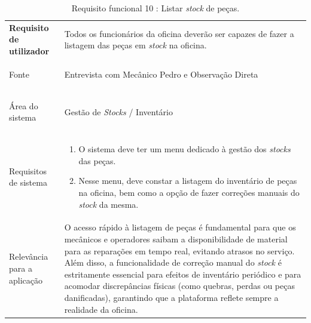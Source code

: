 \documentclass[a4paper,12pt]{scrreprt}
\begin{document}
\begin{table}[H]
    \centering
    \renewcommand{\arraystretch}{1.5} 
    
    \begin{tabular}{|>{\columncolor{gray!15}\bfseries}p{4cm}|p{10.5cm}|}
        \hline
        Requisito de utilizador & Todos os funcionários da oficina deverão ser capazes de fazer a listagem das peças em \textit{stock} na oficina.\\ \hdashline
        
        Fonte & Entrevista com Mecânico Pedro e Observação Direta\\ \hdashline
        
        Área do sistema & Gestão de \textit{Stocks} / Inventário \\ \hdashline
        
        Requisitos de sistema & 
        \begin{enumerate}[leftmargin=*, nosep, topsep=2pt, partopsep=0pt]
            \item O sistema deve ter um menu dedicado à gestão dos \textit{stocks} das peças.
            \item Nesse menu, deve constar a listagem do inventário de peças na oficina, bem como a opção de fazer correções manuais do \textit{stock} da mesma.
        \end{enumerate} \\ \hdashline
        
        Relevância para a aplicação & O acesso rápido à listagem de peças é fundamental para que os mecânicos e operadores saibam a disponibilidade de material para as reparações em tempo real, evitando atrasos no serviço. Além disso, a funcionalidade de correção manual do \textit{stock} é estritamente essencial para efeitos de inventário periódico e para acomodar discrepâncias físicas (como quebras, perdas ou peças danificadas), garantindo que a plataforma reflete sempre a realidade da oficina.\\ \hline
    \end{tabular}
    \caption{Requisito funcional 10 : Listar \textit{stock} de peças.}
    \label{tab:rf_listar_stock}
\end{table}

\paragraph{} 
\end{document}
